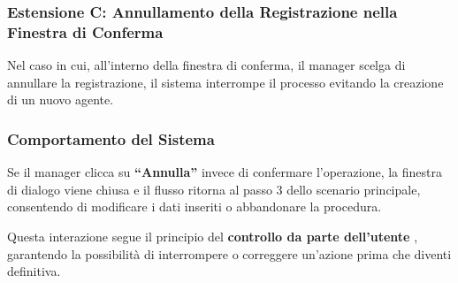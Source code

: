 \subsubsection{Estensione C: Annullamento della Registrazione nella Finestra di Conferma}

Nel caso in cui, all’interno della finestra di conferma, il manager scelga di annullare la registrazione, il sistema interrompe il processo evitando la creazione di un nuovo agente.

\subsubsection{Comportamento del Sistema}
Se il manager clicca su \textbf{“Annulla”} invece di confermare l’operazione, la finestra di dialogo viene chiusa e il flusso ritorna al passo 3 dello scenario principale, consentendo di modificare i dati inseriti o abbandonare la procedura.

Questa interazione segue il principio del \textbf{controllo da parte dell’utente} \cite{nielsen1995}, garantendo la possibilità di interrompere o correggere un’azione prima che diventi definitiva.